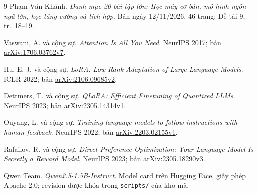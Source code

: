 \documentclass[11pt,a4paper]{article}
\begin{document}

\clearpage

\clearpage

\clearpage

\clearpage

\clearpage

\clearpage

\clearpage

\clearpage


\clearpage
\begin{thebibliography}{9}
Phạm Văn Khánh. \emph{Danh mục 20 bài tập lớn: Học máy cơ bản, mô hình ngôn ngữ lớn,
học tăng cường và tích hợp}. Bản ngày 12/11/2026, 46 trang; Đề tài 9, tr.~18--19.

Vaswani, A. và cộng sự. \emph{Attention Is All You Need}. NeurIPS 2017;
bản \href{https://arxiv.org/abs/1706.03762v7}{arXiv:1706.03762v7}.

Hu, E. J. và cộng sự. \emph{LoRA: Low-Rank Adaptation of Large Language Models}.
ICLR 2022; bản \href{https://arxiv.org/abs/2106.09685v2}{arXiv:2106.09685v2}.

Dettmers, T. và cộng sự. \emph{QLoRA: Efficient Finetuning of Quantized LLMs}.
NeurIPS 2023; bản \href{https://arxiv.org/abs/2305.14314v1}{arXiv:2305.14314v1}.

Ouyang, L. và cộng sự. \emph{Training language models to follow instructions with
human feedback}. NeurIPS 2022; bản \href{https://arxiv.org/abs/2203.02155v1}{arXiv:2203.02155v1}.

Rafailov, R. và cộng sự. \emph{Direct Preference Optimization: Your Language Model
Is Secretly a Reward Model}. NeurIPS 2023;
bản \href{https://arxiv.org/abs/2305.18290v3}{arXiv:2305.18290v3}.

Qwen Team. \emph{Qwen2.5-1.5B-Instruct}. Model card trên Hugging Face, giấy phép
Apache-2.0; revision được khóa trong \texttt{scripts/} của kho mã.
\end{thebibliography}
\end{document}
